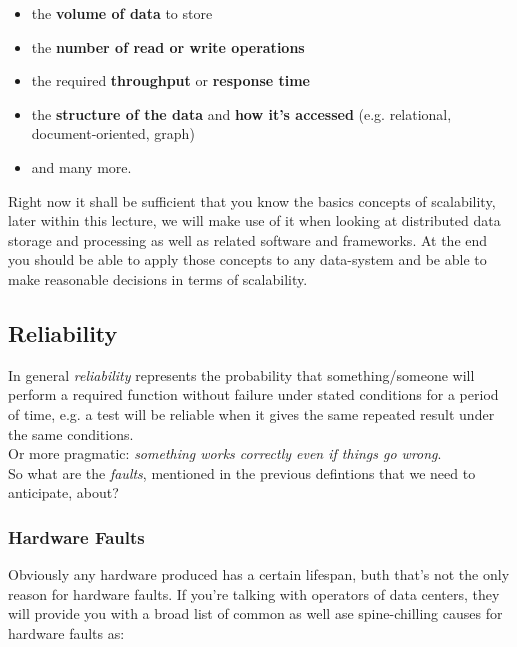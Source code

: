 \begin{itemize}
			\item the \textbf{volume of data} to store
			\item the \textbf{number of read or write operations}
			\item the required \textbf{throughput} or \textbf{response time}
			\item the \textbf{structure of the data} and \textbf{how it's accessed} (e.g. relational, document-oriented, graph)
			\item and many more.\\
\end{itemize}

Right now it shall be sufficient that you know the basics concepts of scalability, later within this lecture, we will make use of it when looking at distributed data storage and processing as well as related software and frameworks. At the end you should be able to apply those concepts to any data-system and be able to make reasonable decisions in terms of scalability.

\newpage

\subsection{Reliability}
\label{tf_nfreq_avrel}
In general \textit{reliability} represents the probability that something/someone will perform a required function without failure under stated conditions for a period of time, e.g. a test will be reliable when it gives the same repeated result under the same conditions. \\Or more pragmatic: \textit{something works correctly even if things go wrong}.\\

So what are the \textit{faults}, mentioned in the previous defintions that we need to anticipate, about?

\subsubsection{Hardware Faults}
\label{tf_nfreq_reliability_hardware_faults}

Obviously any hardware produced has a certain lifespan, buth that's not the only reason for hardware faults. If you're talking with operators of data centers, they will provide you with a broad list of common as well ase spine-chilling causes for hardware faults as:\\

